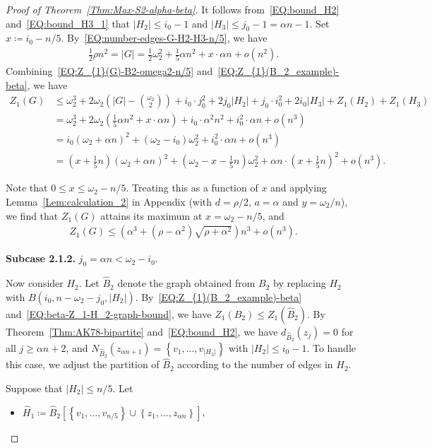 \documentclass[11pt,a4paper]{article}
\begin{document}
\begin{proof}[Proof of Theorem~\ref{Thm:Max-S2-alpha-beta}]
It follows from~\eqref{EQ:bound_H2} and~\eqref{EQ:bound_H3_1} that $|H_2| \le i_0 -1$ and $|H_3| \le j_0 - 1 = \alpha n-1$. 
Set $x \coloneqq i_0 -n/5$. 
By~\eqref{EQ:number-edges-G-H2-H3-n/5}, 
we have 
\begin{align*}
\frac{1}{2} \rho n^2
= |G| 
= \frac{1}{2} \omega_2^2 + \frac{1}{5} \alpha n^2 + x \cdot \alpha n+ o(n^2). 
\end{align*}
Combining~\eqref{EQ:Z_{1}(G)-B2-omega2-n/5} and~\eqref{EQ:Z_{1}(B_2_example)-beta}, we have 
\begin{align*}
Z_{1}(G) 
& \le \omega_2^3 + 2\omega_2 \left(|G| - \binom{\omega_2}{2}\right) + i_0 \cdot j_0^2+ 2j_0 |H_2| + j_0 \cdot i_0^2+ 2i_0 |H_3|+Z_{1}(H_2) + Z_{1}(H_3)\\
&= \omega_2^3 + 2\omega_2 \left(\frac{1}{5} \alpha n^2 + x \cdot \alpha n\right) + i_0 \cdot \alpha^2 n^2 + i_0^2 \cdot \alpha n +o(n^3)\\
&= i_0(\omega_2 +\alpha n)^2 +(\omega_2 -i_0) \omega_2^2 + i_0^2 \cdot \alpha n +o(n^3)\\
&= \left(x+\frac{1}{5}n\right)(\omega_2 +\alpha n)^2 +\left(\omega_2 -x-\frac{1}{5}n\right) \omega_2^2 + \alpha n \cdot \left(x+\frac{1}{5}n\right)^2 +o(n^3).
\end{align*}

Note that $0 \le x \le \omega_2 -n/5$. 
Treating this as a function of $x$ and applying Lemma~\ref{Lem:calculation_2} in Appendix (with $d = \rho/2$, $a =\alpha$ and $y =\omega_2/n$), we find that $Z_{1}(G)$ attains its maximum at $x = \omega_2 - n/5$, and 
\begin{align*}
Z_{1}(G) 
\le \left(\alpha^3+(\rho-\alpha^2) \sqrt{\rho+\alpha^2}\right)n^3 + o(n^3).
\end{align*}

\textbf{Subcase 2.1.2. } $j_0 = \alpha n < \omega_2 -i_0$. 

Now consider $H_2$. 
Let $\hat{B}_2$ denote the graph obtained from $B_2$ by replacing $H_2$ with $B(i_0,n- \omega_2 -j_0,|H_2|)$. 
By~\eqref{EQ:Z_{1}(B_2_example)-beta} and~\eqref{EQ:beta-Z_1-H_2-graph-bound}, we have $Z_{1}(B_2) \le Z_{1}(\hat{B}_2)$. 
By Theorem~\ref{Thm:AK78-bipartite} and~\eqref{EQ:bound_H2}, we have $d_{\hat{B}_2}(z_j) = 0$ for all $j \ge \alpha n+2$, and $N_{\hat{B}_2}(z_{\alpha n+1}) = \left\{v_1, \ldots, v_{|H_2|}\right\}$ with $|H_2| \le i_0-1$. 
To handle this case, we adjust the partition of $\hat{B}_2$ according to the number of edges in $H_2$. 

Suppose that $|H_2| \le n/5$. 
Let  
\begin{itemize}
\item $\hat{H}_1 \coloneqq  \hat{B}_2\left[\left\{v_1,\ldots,v_{n/5}\right\} \cup \left\{z_1,\ldots,z_{\alpha n}\right\}\right]$, 


\end{itemize}
\end{proof}
\end{document}
